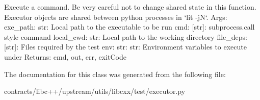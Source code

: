 \begin{DoxyVerb}Execute a command.
    Be very careful not to change shared state in this function.
    Executor objects are shared between python processes in `lit -jN`.
Args:
    exe_path: str:    Local path to the executable to be run
    cmd: [str]:       subprocess.call style command
    local_cwd: str:   Local path to the working directory
    file_deps: [str]: Files required by the test
    env: {str: str}:  Environment variables to execute under
Returns:
    cmd, out, err, exitCode
\end{DoxyVerb}
 

The documentation for this class was generated from the following file\+:\begin{DoxyCompactItemize}
\item 
contracts/libc++/upstream/utils/libcxx/test/executor.\+py\end{DoxyCompactItemize}
